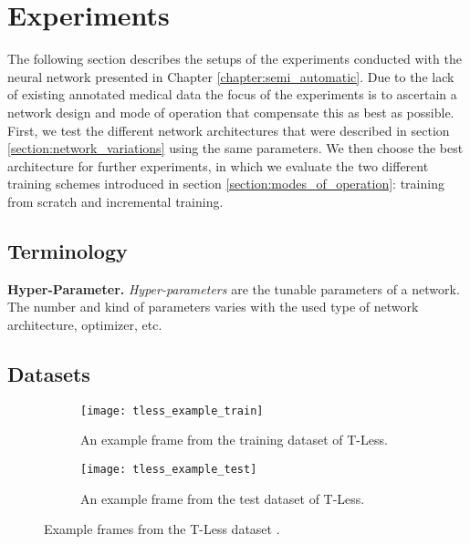 
\chapter{Experiments} \label{chapter:experiments}

The following section describes the setups of the experiments conducted with the neural network presented in Chapter \ref{chapter:semi_automatic}. Due to the lack of existing annotated medical data the focus of the experiments is to ascertain a network design and mode of operation that compensate this as best as possible. First, we test the different network architectures that were described in section \ref{section:network_variations} using the same parameters. We then choose the best architecture for further experiments, in which we evaluate the two different training schemes introduced in section \ref{section:modes_of_operation}: training from scratch and incremental training.

\section{Terminology}

\noindent\textbf{Hyper-Parameter.} \textit{Hyper-parameters} are the tunable parameters of a network. The number and kind of parameters varies with the used type of network architecture, optimizer, etc.

\section{Datasets}

\begin{figure}[!tbp]
	\centering
	\begin{subfigure}[t]{0.47\textwidth}
		\centering
    	\texttt{[image: tless\_example\_train]}
    	\caption{An example frame from the training dataset of T-Less.}
    	\label{fig:tless_example_train}
	\end{subfigure}
	\hfill
	\begin{subfigure}[t]{0.47\textwidth}
		\centering
    	\texttt{[image: tless\_example\_test]}
    	\caption{An example frame from the test dataset of T-Less.}
    	\label{fig:tless_example_test}
	\end{subfigure}
	\caption{Example frames from the T-Less dataset \cite{tless}.}
	\label{fig:tless_examples}
\end{figure}

